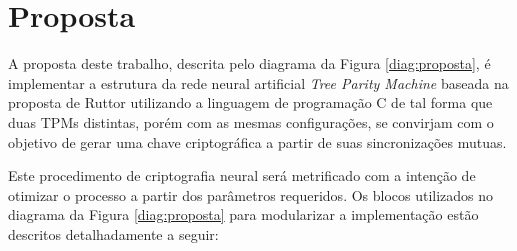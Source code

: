 \documentclass[12pt]{article}
\begin{document}
  
    \section{Proposta}
    \label{sec:proposta}
    
        
        
        A proposta deste trabalho, descrita pelo diagrama da Figura \ref{diag:proposta}, é implementar a estrutura da rede neural artificial \textit{Tree Parity Machine} baseada na proposta de Ruttor \cite{ruttor2007neural} utilizando a linguagem de programação C de tal forma que duas TPMs distintas, porém com as mesmas configurações, se convirjam com o objetivo de gerar uma chave criptográfica a partir de suas sincronizações mutuas.
        
        Este procedimento de criptografia neural será metrificado com a intenção de otimizar o processo a partir dos parâmetros requeridos. Os blocos utilizados no diagrama da Figura \ref{diag:proposta} para modularizar a implementação estão descritos detalhadamente a seguir: 
        
    
\end{document}
